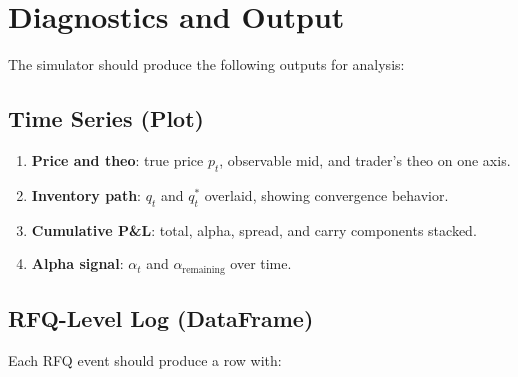 \documentclass[11pt,a4paper]{article}
\begin{document}
\section{Diagnostics and Output}\label{sec:diagnostics}

The simulator should produce the following outputs for analysis:

\subsection{Time Series (Plot)}

\begin{enumerate}[leftmargin=2em]
  \item \textbf{Price and theo}: true price $p_t$, observable mid, and trader's theo on one axis.
  \item \textbf{Inventory path}: $q_t$ and $q^*_t$ overlaid, showing convergence behavior.
  \item \textbf{Cumulative P\&L}: total, alpha, spread, and carry components stacked.
  \item \textbf{Alpha signal}: $\alpha_t$ and $\alpha_{\text{remaining}}$ over time.
\end{enumerate}

\subsection{RFQ-Level Log (DataFrame)}

Each RFQ event should produce a row with:
\end{document}
